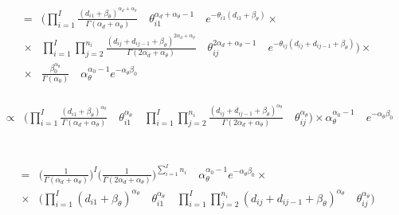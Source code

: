 \documentclass[10pt]{report}
\theoremstyle{plain}
\begin{document}
\begin{eqnarray*}
&=&\Bigg(\prod_{i=1}^I \frac{(d_{i1}+\beta_\theta)^{\alpha_d+\alpha_\theta}}{\Gamma(\alpha_d+\alpha_\theta)} \quad \theta_{i1}^{\alpha_d+\alpha_\theta-1} \quad e^{-\theta_{i1}(d_{i1}+\beta_\theta)} \times\\
&\times& \prod_{i=1}^I \prod_{j=2}^{n_i} \frac{(d_{ij}+d_{ij-1}+\beta_\theta)^{2\alpha_d+\alpha_\theta}}{\Gamma(2\alpha_d+\alpha_\theta)} \quad \theta_{ij}^{2\alpha_d+\alpha_\theta-1} \quad e^{-\theta_{ij}(d_{ij}+d_{ij-1}+\beta_\theta)}\Bigg) \times \\
&\times & \frac{\beta_0^{\alpha_0}}{\Gamma(\alpha_0)} \quad \alpha_\theta^{\alpha_0-1} e^{-\alpha_\theta\beta_0}
\end{eqnarray*}
\\
\begin{eqnarray*}
&\propto& \Bigg(\prod_{i=1}^I \frac{(d_{i1}+\beta_\theta)^{\alpha_\theta}}{\Gamma(\alpha_d+\alpha_\theta)} \quad \theta_{i1}^{\alpha_\theta} \quad \prod_{i=1}^I \prod_{j=2}^{n_i} \frac{(d_{ij}+d_{ij-1}+\beta_\theta)^{\alpha_\theta}}{\Gamma(2\alpha_d+\alpha_\theta)}\quad\theta_{ij}^{\alpha_\theta}\Bigg) \times \alpha_\theta^{\alpha_0-1} \quad e^{-\alpha_\theta\beta_0}
\end{eqnarray*}
\\
\\
\begin{eqnarray*}
&=&\Big(\frac{1}{\Gamma(\alpha_d+\alpha_\theta)}\Big)^I \Big(\frac{1}{\Gamma(2\alpha_d+\alpha_\theta)}\Big)^{\sum_{i=1}^I n_i} \quad \alpha_\theta^{\alpha_0-1} e^{-\alpha_\theta\beta_0} \times \\
&\times& \Bigg(\prod_{i=1}^I (d_{i1}+\beta_\theta)^{\alpha_\theta} \quad \theta_{i1}^{\alpha_\theta}\quad \prod_{i=1}^I \prod_{j=2}^{n_i} (d_{ij}+d_{ij-1}+\beta_\theta)^{\alpha_\theta} \quad \theta_{ij}^{\alpha_\theta}\Bigg)
\end{eqnarray*}
\\
\\
\\
\end{document}
